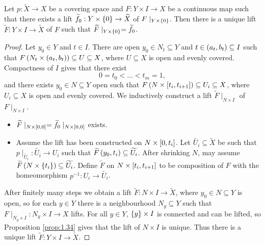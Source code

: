\begin{proposition}
\label{prop:1.30}
Let $ p : \widetilde{X} \to X $ be a covering space and $ F : Y \times I \to X $ be a continuous map such that there exists a lift $ \widetilde{f_0} : Y \times \cb{0} \to \widetilde{X} $ of $ F \mid_{Y \times \cb{0}} $. Then there is a unique lift $ \widetilde{F} : Y \times I \to \widetilde{X} $ of $ F $ such that $ \widetilde{F} \mid_{Y \times \cb{0}} = \widetilde{f_0} $.
\end{proposition}

\begin{proof}
Let $ y_0 \in Y $ and $ t \in I $. There are open $ y_0 \in N_t \subseteq Y $ and $ t \in \rb{a_t, b_t} \subseteq I $ such that $ F\rb{N_t \times \rb{a_t, b_t}} \subseteq U \subseteq X $, where $ U \subseteq X $ is open and evenly covered. Compactness of $ I $ gives that there exist
$$ 0 = t_0 < \dots < t_m = 1, $$
and there exists $ y_0 \in N \subseteq Y $ open such that $ F\rb{N \times \sb{t_i, t_{i + 1}}} \subseteq U_i \subseteq X $, where $ U_i \subseteq X $ is open and evenly covered. We inductively construct a lift $ \widetilde{F} \mid_{N \times I} $ of $ F \mid_{N \times I} $.
\begin{itemize}
\item $ \widetilde{F} \mid_{N \times \sb{0, 0}} = \widetilde{f_0} \mid_{N \times \sb{0, 0}} $ exists.
\item Assume the lift has been constructed on $ N \times \sb{0, t_i} $. Let $ \widetilde{U_i} \subseteq \widetilde{X} $ be such that $ p \mid_{\widetilde{U_i}} : \widetilde{U_i} \to U_i $ such that $ \widetilde{F}\rb{y_0, t_i} \subseteq \widetilde{U_i} $. After shrinking $ N $, may assume $ \widetilde{F}\rb{N \times \cb{t_i}} \subseteq \widetilde{U_i} $. Define $ \widetilde{F} $ on $ N \times \sb{t_i, t_{i + 1}} $ to be composition of $ F $ with the homeomorphism $ p^{-1} : U_i \to \widetilde{U_i} $.
\end{itemize}
After finitely many steps we obtain a lift $ \widetilde{F} : N \times I \to \widetilde{X} $, where $ y_0 \in N \subseteq Y $ is open, so for each $ y \in Y $ there is a neighbourhood $ N_y \subseteq Y $ such that $ F \mid_{N_y \times I} : N_y \times I \to X $ lifts. For all $ y \in Y $, $ \cb{y} \times I $ is connected and can be lifted, so Proposition \ref{prop:1.34} gives that the lift of $ N \times I $ is unique. Thus there is a unique lift $ \widetilde{F} : Y \times I \to \widetilde{X} $.
\end{proof}

